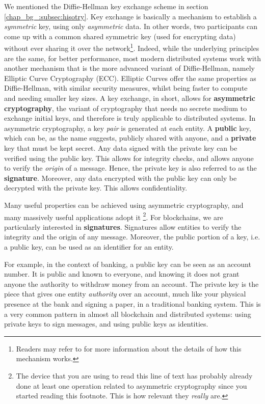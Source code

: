 We mentioned the Diffie-Hellman key exchange scheme in section \ref{chap_bg_:subsec:hisotry}. Key
exchange is basically a mechanism to establish a \textit{symmetric} key, using only
\textit{asymmetric} data. In other words, two participants can come up with a common shared
symmetric key (used for encrypting data) without ever sharing it over the network\footnote{Readers
may refer to \cite{diffieNewDirectionsCryptography1976} for more information about the details of
how this mechanism works.}. Indeed, while the underlying principles are the same, for better
performance, most modern distributed systems work with another mechanism that is the more advanced
variant of Diffie-Hellman, namely Elliptic Curve Cryptography (ECC). Elliptic Curves offer the same
properties as Diffie-Hellman, with similar security measures, whilst being faster to compute and
needing smaller key sizes. A key exchange, in short, allows for \textbf{asymmetric cryptography},
the variant of cryptography that needs no secrete medium to exchange initial keys, and therefore is
truly applicable to distributed systems. In asymmetric cryptography, a key \textit{pair} is
generated at each entity. A \textbf{public} key, which can be, as the name suggests, publicly shared
with anyone, and a \textbf{private} key that must be kept secret. Any data signed with the private
key can be verified using the public key. This allows for integrity checks, and allows anyone to
verify the \textit{origin} of a message. Hence, the private key is also referred to as the
\textbf{signature}. Moreover, any data encrypted with the public key can only be decrypted with the
private key. This allows confidentiality.

Many useful properties can be achieved using asymmetric cryptography, and many massively useful
applications adopt it \footnote{The device that you are using to read this line of text has probably
already done at least one operation related to asymmetric cryptography since you started reading
this footnote. This is how relevant they \textit{really} are.}. For blockchains, we are particularly
interested in \textbf{signatures}. Signatures allow entities to verify the integrity and the origin
of any message. Moreover, the public portion of a key, i.e. a public key, can be used as an
identifier for an entity.

For example, in the context of banking, a public key can be seen as an account number. It is public
and known to everyone, and knowing it does not grant anyone the authority to withdraw money from an
account. The private key is the piece that gives one entity \textit{authority} over an account, much
like your physical presence at the bank and signing a paper, in a traditional banking system. This
is a very common pattern in almost all blockchain and distributed systems: using private keys to
sign messages, and using public keys as identities.

